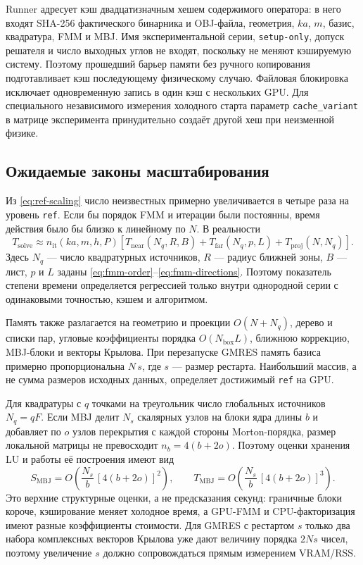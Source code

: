 \documentclass[12pt,a4paper]{article}
\begin{document}
Runner адресует кэш двадцатизначным хешем содержимого оператора: в него входят
SHA-256 фактического бинарника и OBJ-файла, геометрия, $ka$, $m$, базис,
квадратура, FMM и MBJ. Имя экспериментальной серии, \texttt{setup-only},
допуск решателя и число выходных углов не входят, поскольку не меняют
кэшируемую систему. Поэтому прошедший барьер памяти без ручного копирования
подготавливает кэш последующему физическому случаю. Файловая блокировка
исключает одновременную запись в один кэш с нескольких GPU.
Для специального независимого измерения холодного старта параметр
\texttt{cache\_variant} в матрице эксперимента принудительно создаёт другой
хеш при неизменной физике.

\subsection{Ожидаемые законы масштабирования}

Из \eqref{eq:ref-scaling} число неизвестных примерно увеличивается в четыре
раза на уровень \texttt{ref}. Если бы порядок FMM и итерации были постоянны,
время действия было бы близко к линейному по $N$. В реальности
\begin{equation}
  T_{\mathrm{solve}}\approx
  n_{\mathrm{it}}(ka,m,h,P)
  \left[T_{\mathrm{near}}(N_q,R,B)+
  T_{\mathrm{far}}(N_q,p,L)+T_{\mathrm{proj}}(N,N_q)\right].
  \label{eq:time-model}
\end{equation}
Здесь $N_q$ --- число квадратурных источников, $R$ --- радиус ближней зоны,
$B$ --- лист, $p$ и $L$ заданы \eqref{eq:fmm-order}--\eqref{eq:fmm-directions}.
Поэтому показатель степени времени определяется регрессией только внутри
однородной серии с одинаковыми точностью, кэшем и алгоритмом.

Память также разлагается на геометрию и проекции $O(N+N_q)$, дерево и списки
пар, угловые коэффициенты порядка $O(N_{\mathrm{box}}L)$, ближнюю коррекцию,
MBJ-блоки и векторы Крылова. При перезапуске GMRES память базиса примерно
пропорциональна $N\,s$, где $s$ --- размер рестарта. Наибольший массив, а не
сумма размеров исходных данных, определяет достижимый \texttt{ref} на GPU.

Для квадратуры с $q$ точками на треугольник число глобальных источников
$N_q=qF$. Если MBJ делит $N_s$ скалярных узлов на блоки ядра длины $b$ и
добавляет по $o$ узлов перекрытия с каждой стороны Morton-порядка, размер
локальной матрицы не превосходит $n_b=4(b+2o)$. Поэтому оценки хранения LU и
работы её построения имеют вид
\begin{equation}
  S_{\mathrm{MBJ}}=O\!\left(\frac{N_s}{b}\,[4(b+2o)]^2\right),\qquad
  T_{\mathrm{MBJ}}=O\!\left(\frac{N_s}{b}\,[4(b+2o)]^3\right).
  \label{eq:mbj-resource-model}
\end{equation}
Это верхние структурные оценки, а не предсказания секунд: граничные блоки
короче, кэширование меняет холодное время, а GPU-FMM и CPU-факторизация имеют
разные коэффициенты стоимости. Для GMRES с рестартом $s$ только два набора
комплексных векторов Крылова уже дают величину порядка $2Ns$ чисел, поэтому
увеличение $s$ должно сопровождаться прямым измерением VRAM/RSS.
\end{document}
